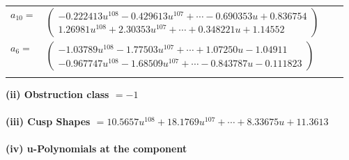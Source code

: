 \documentclass[1p]{elsarticle_modified}
\theoremstyle{definition}
\begin{document}
\begin{tabular}{m{7pt} m{180pt} m{7pt} m{180pt} }
\flushright $a_{10}=$&$\begin{pmatrix}-0.222413 u^{108}-0.429613 u^{107}+\cdots-0.690353 u+0.836754\\1.26981 u^{108}+2.30353 u^{107}+\cdots+0.348221 u+1.14552\end{pmatrix}$ \\
\flushright $a_{6}=$&$\begin{pmatrix}-1.03789 u^{108}-1.77503 u^{107}+\cdots+1.07250 u-1.04911\\-0.967747 u^{108}-1.68509 u^{107}+\cdots-0.843787 u-0.111823\end{pmatrix}$\\&\end{tabular}
\flushleft \textbf{(ii) Obstruction class $= -1$}\\~\\
\flushleft \textbf{(iii) Cusp Shapes $= 10.5657 u^{108}+18.1769 u^{107}+\cdots+8.33675 u+11.3613$}\\~\\
\newpage\renewcommand{\arraystretch}{1}
\flushleft \textbf{(iv) u-Polynomials at the component}\newline \\
\end{document}
